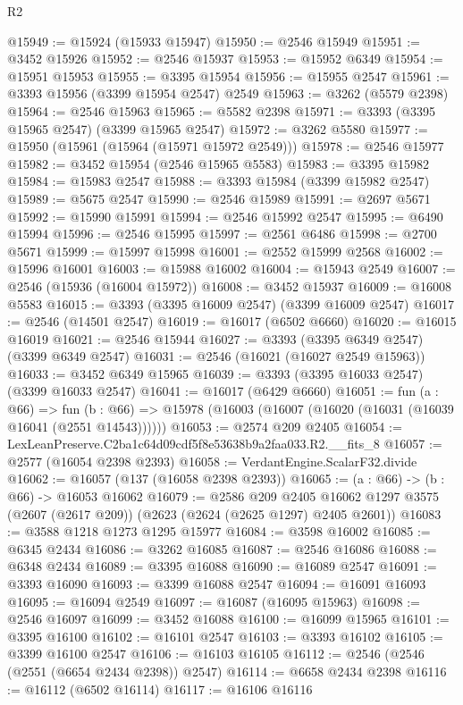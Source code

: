 \begin{lexlean}{R2}
\begin{coremodule}
@15949 := @15924 (@15933 @15947)
@15950 := @2546 @15949
@15951 := @3452 @15926
@15952 := @2546 @15937
@15953 := @15952 @6349
@15954 := @15951 @15953
@15955 := @3395 @15954
@15956 := @15955 @2547
@15961 := @3393 @15956 (@3399 @15954 @2547) @2549
@15963 := @3262 (@5579 @2398)
@15964 := @2546 @15963
@15965 := @5582 @2398
@15971 := @3393 (@3395 @15965 @2547) (@3399 @15965 @2547)
@15972 := @3262 @5580
@15977 := @15950 (@15961 (@15964 (@15971 @15972 @2549)))
@15978 := @2546 @15977
@15982 := @3452 @15954 (@2546 @15965 @5583)
@15983 := @3395 @15982
@15984 := @15983 @2547
@15988 := @3393 @15984 (@3399 @15982 @2547)
@15989 := @5675 @2547
@15990 := @2546 @15989
@15991 := @2697 @5671
@15992 := @15990 @15991
@15994 := @2546 @15992 @2547
@15995 := @6490 @15994
@15996 := @2546 @15995
@15997 := @2561 @6486
@15998 := @2700 @5671
@15999 := @15997 @15998
@16001 := @2552 @15999 @2568
@16002 := @15996 @16001
@16003 := @15988 @16002
@16004 := @15943 @2549
@16007 := @2546 (@15936 (@16004 @15972))
@16008 := @3452 @15937
@16009 := @16008 @5583
@16015 := @3393 (@3395 @16009 @2547) (@3399 @16009 @2547)
@16017 := @2546 (@14501 @2547)
@16019 := @16017 (@6502 @6660)
@16020 := @16015 @16019
@16021 := @2546 @15944
@16027 := @3393 (@3395 @6349 @2547) (@3399 @6349 @2547)
@16031 := @2546 (@16021 (@16027 @2549 @15963))
@16033 := @3452 @6349 @15965
@16039 := @3393 (@3395 @16033 @2547) (@3399 @16033 @2547)
@16041 := @16017 (@6429 @6660)
@16051 := fun (a : @66) =>
  fun (b : @66) => @15978 (@16003 (@16007 (@16020 (@16031 (@16039 @16041 (@2551 @14543))))))
@16053 := @2574 @209 @2405
@16054 := LexLeanPreserve.C2ba1c64d09cdf5f8e53638b9a2faa033.R2.__fits_8
@16057 := @2577 (@16054 @2398 @2393)
@16058 := VerdantEngine.ScalarF32.divide
@16062 := @16057 (@137 (@16058 @2398 @2393))
@16065 := (a : @66) -> (b : @66) -> @16053 @16062
@16079 := @2586
    @209
    @2405
    @16062
    @1297
    @3575
    (@2607 (@2617 @209))
    (@2623 (@2624 (@2625 @1297) @2405 @2601))
@16083 := @3588 @1218 @1273 @1295 @15977
@16084 := @3598 @16002
@16085 := @6345 @2434
@16086 := @3262 @16085
@16087 := @2546 @16086
@16088 := @6348 @2434
@16089 := @3395 @16088
@16090 := @16089 @2547
@16091 := @3393 @16090
@16093 := @3399 @16088 @2547
@16094 := @16091 @16093
@16095 := @16094 @2549
@16097 := @16087 (@16095 @15963)
@16098 := @2546 @16097
@16099 := @3452 @16088
@16100 := @16099 @15965
@16101 := @3395 @16100
@16102 := @16101 @2547
@16103 := @3393 @16102
@16105 := @3399 @16100 @2547
@16106 := @16103 @16105
@16112 := @2546 (@2546 (@2551 (@6654 @2434 @2398)) @2547)
@16114 := @6658 @2434 @2398
@16116 := @16112 (@6502 @16114)
@16117 := @16106 @16116

\end{coremodule}
\end{lexlean}

